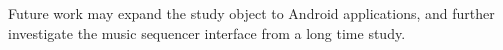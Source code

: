 Future work may expand the study object to Android applications, and further investigate the music sequencer interface from a long time study.



%


\clearpage
